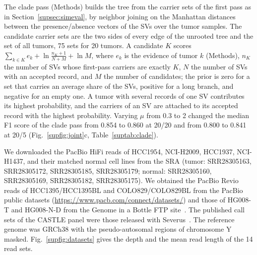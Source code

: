 The clade pass (Methods) builds the tree from the carrier sets of the first pass as in Section~\ref{supsec:simeval}, by neighbor joining on the Manhattan distances between the presence/absence vectors of the SVs over the tumor samples.
The candidate carrier sets are the two sides of every edge of the unrooted tree and the set of all tumors, 75 sets for 20 tumors.
A candidate $K$ scores $\sum_{k\in K} e_k + \ln\frac{n_K+1}{N+M} + \ln M$, where $e_k$ is the evidence of tumor $k$ (Methods), $n_K$ the number of SVs whose first-pass carriers are exactly $K$, $N$ the number of SVs with an accepted record, and $M$ the number of candidates; the prior is zero for a set that carries an average share of the SVs, positive for a long branch, and negative for an empty one.
A tumor with several records of one SV contributes its highest probability, and the carriers of an SV are attached to its accepted record with the highest probability.
Varying $\mu$ from 0.3 to 2 changed the median F1 score of the clade pass from 0.854 to 0.860 at 20/20 and from 0.800 to 0.841 at 20/5 (Fig.~\ref{supfig:joint}c, Table~\ref{suptab:clade}).

\FloatBarrier
{}


{\sloppy We downloaded the PacBio HiFi reads of HCC1954, NCI-H2009, HCC1937, NCI-H1437, and their matched normal cell lines from the SRA (tumor: SRR28305163, SRR28305172, SRR28305185, SRR28305179; normal: SRR28305160, SRR28305169, SRR28305182, SRR28305175).
We obtained the PacBio Revio reads of HCC1395/HCC1395BL and COLO829/COLO829BL from the PacBio public datasets (\url{https://www.pacb.com/connect/datasets/}) and those of HG008-T and HG008-N-D from the Genome in a Bottle FTP site~\cite{hg008}.
The published call sets of the CASTLE panel were those released with Severus~\cite{severus}.
The reference genome was GRCh38 with the pseudo-autosomal regions of chromosome Y masked.
Fig.~\ref{supfig:datasets} gives the depth and the mean read length of the 14 read sets.\par}


